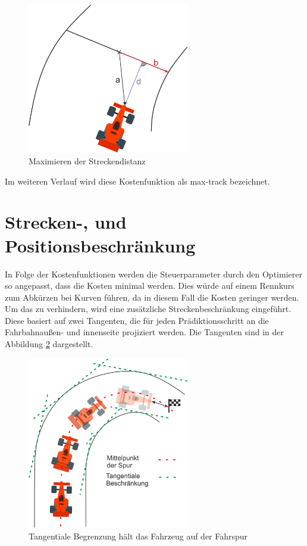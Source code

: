 \documentclass{like}
\begin{document}
\begin{figure}[ht!]
	\centering
	\includegraphics[width=200pt]{Abbildungen/vektorRejection.png}
	\caption{Maximieren der Streckendistanz}
	\label{fig:maxDist}
\end{figure}
Im weiteren Verlauf wird diese Kostenfunktion als max-track bezeichnet.

\section{Strecken-, und Positionsbeschränkung}
\label{trackAndPosConstraint}
In Folge der Kostenfunktionen werden die Steuerparameter durch den Optimierer so angepasst, dass die Kosten minimal werden. Dies würde auf einem Rennkurs zum Abkürzen bei Kurven führen, da in diesem Fall die Kosten geringer werden. Um das zu verhindern, wird eine zusätzliche Streckenbeschränkung eingeführt. Diese basiert auf zwei Tangenten, die für jeden Prädiktionsschritt an die Fahrbahnaußen- und innenseite projiziert werden. Die Tangenten sind in der Abbildung \ref{fig:tangentialConstraint} dargestellt.
\begin{figure}[ht!]
	\centering
	\includegraphics[width=200pt]{Abbildungen/tangentialConstraint.png}
	\caption{Tangentiale Begrenzung hält das Fahrzeug auf der Fahrspur}
	\label{fig:tangentialConstraint}
\end{figure}
\end{document}
